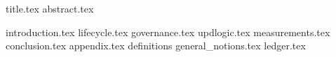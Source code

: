 \documentclass[11pt]{llncs}
\begin{document}
{title.tex}
{abstract.tex}

{introduction.tex}
{lifecycle.tex}
{governance.tex}
{updlogic.tex}
{measurements.tex}
{conclusion.tex}
{appendix.tex}
{definitions}
{general_notions.tex}
{ledger.tex}



\end{document}
